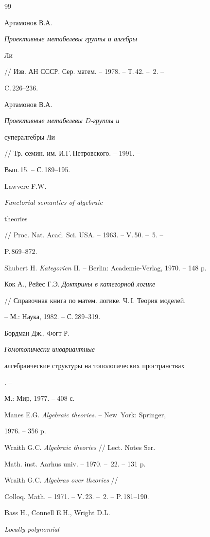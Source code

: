 \begin{thebibliography}{99}


Артамонов В.А. {\em Проективные метабелевы группы и алгебры


Ли} // Изв. АН СССР. Сер. матем. -- 1978. -- Т.\,42. -- \No\,2. --


C.\,226--236.




Артамонов В.А. {\em Проективные метабелевы $D$-группы и


супералгебры Ли} // Тр. семин. им. И.Г.\,Петровского. -- 1991. -- 


Вып.\,15. -- С.\,189--195.




Lawvere F.W. {\em Functorial semantics of algebraic


theories} // Proc. Nat. Acad. Sci. USA. -- 1963. -- V.\,50. -- \No\,5. --


P.\,869--872.




Shubert H. {\em Kategorien} II. -- Berlin: Academie-Verlag, 1970. -- 148 p.




Кок А., Рейес Г.Э. {\em Доктрины в категорной логике}


// Справочная книга по матем. логике. Ч.\,I. Теория моделей.


-- М.: Наука, 1982. -- С.\,289--319.




Бордман Дж., Фогт Р. {\em Гомотопически инвариантные


алгебраические структуры на топологических пространствах}. --


М.: Мир, 1977. -- 408 с.




Manes E.G. {\em Algebraic theories}. -- New~York: Springer,


1976. -- 356 p.




Wraith G.C. {\em Algebraic theories} // Lect. Notes Ser.


Math. inst. Aarhus univ. -- 1970. -- \No\,22. -- 131 p.




Wraith G.C. {\em Algebras over theories} //


Colloq. Math. -- 1971. -- V.\,23. -- \No\,2. -- P.\,181--190.




Bass H., Connell E.H., Wright D.L. {\em Locally polynomial


}
\end{thebibliography}
